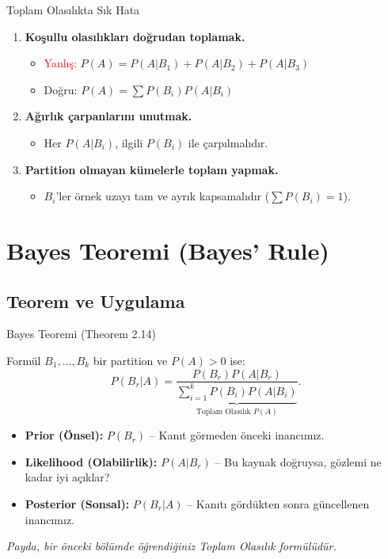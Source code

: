 \documentclass[light]{lutbeamer}
\begin{document}
\begin{frame}{Toplam Olasılıkta Sık Hata}
    \begin{enumerate}
        \item \textbf{Koşullu olasılıkları doğrudan toplamak.}
        \begin{itemize}
            \item \textcolor{red}{Yanlış:} $P(A)=P(A|B_1)+P(A|B_2)+P(A|B_3)$
            \item \textcolor{green!60!black}{Doğru:} $P(A)=\sum P(B_i)P(A|B_i)$
        \end{itemize}
        \item \textbf{Ağırlık çarpanlarını unutmak.}
        \begin{itemize}
            \item Her $P(A|B_i)$, ilgili $P(B_i)$ ile çarpılmalıdır.
        \end{itemize}
        \item \textbf{Partition olmayan kümelerle toplam yapmak.}
        \begin{itemize}
            \item $B_i$'ler örnek uzayı tam ve ayrık kapsamalıdır ($\sum P(B_i)=1$).
        \end{itemize}
    \end{enumerate}
\end{frame}

\section{Bayes Teoremi (Bayes' Rule)}
\subsection{Teorem ve Uygulama}

\begin{frame}[fragile]{Bayes Teoremi (Theorem 2.14)}
    \begin{block}{Formül}
        \(B_1,\dots,B_k\) bir partition ve \(P(A)>0\) ise:
        \[
        P(B_r|A)
        =
        \frac{P(B_r)P(A|B_r)}
        {\underbrace{\sum_{i=1}^{k}P(B_i)P(A|B_i)}_{\text{Toplam Olasılık } P(A)}}.
        \]
    \end{block}

    \begin{itemize}
        \item \textbf{Prior (Önsel):} \(P(B_r)\) -- Kanıt görmeden önceki inancımız.
        \item \textbf{Likelihood (Olabilirlik):} \(P(A|B_r)\) -- Bu kaynak doğruysa, gözlemi ne kadar iyi açıklar?
        \item \textbf{Posterior (Sonsal):} \(P(B_r|A)\) -- Kanıtı gördükten sonra güncellenen inancımız.
    \end{itemize}

    \vspace{0.15cm}
    \footnotesize
    \textit{Payda, bir önceki bölümde öğrendiğiniz Toplam Olasılık formülüdür.}
\end{frame}
\end{document}
